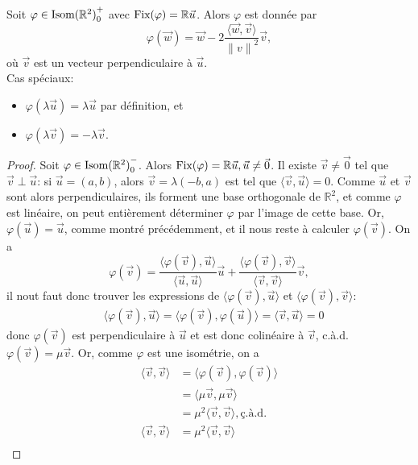 \documentclass{book}
\numberwithin{equation}{section}
\renewcommand{\phi}{\varphi}
\providecommand{\plan}{{\mathbb R^2}}
\providecommand{\origin}{{\vec 0}}
\providecommand{\isom}{{\textnormal{Isom}(\plan)}}
\providecommand{\isomop}{\isom_0^+}
\providecommand{\isomom}{\isom_0^-}
\providecommand{\Fix}{{\textnormal{Fix}}}
\providecommand{\longueur}[1]{{\lVert#1\rVert}}
\providecommand{\scalaire}[1]{{\langle#1\rangle}}
\begin{document}
\begin{thm}
	Soit $\phi \in \isomop$ avec $\Fix(\phi) = \mathbb R \vec u$. Alors $\phi$ est donnée par 
	\begin{equation}
		\phi(\vec w) = \vec w - 2\frac{\scalaire{\vec w, \vec v}}{\longueur{v}^2} \vec v,
	\end{equation}
	où $\vec v$ est un vecteur perpendiculaire à $\vec u$.\\
	Cas spéciaux:
	\begin{itemize}
		\item $\phi(\lambda \vec u) = \lambda \vec u$ par définition, et
		\item $\phi(\lambda \vec v) = -\lambda \vec v$.
	\end{itemize}
\end{thm}
\begin{proof}
	Soit $\phi \in \isomom$. Alors $\Fix(\phi) = \mathbb R \vec u, \vec u \neq \origin$. Il existe $\vec v \neq \origin$ tel que $\vec v \perp \vec u$: si $\vec u = (a, b)$, alors $\vec v = \lambda(-b, a)$ est tel que $\scalaire{\vec v, \vec u} = 0$. Comme $\vec u$ et $\vec v$ sont alors perpendiculaires, ils forment une base orthogonale de $\plan$, et comme $\phi$ est linéaire, on peut entièrement déterminer $\phi$ par l'image de cette base. Or, $\phi(\vec u) = \vec u$, comme montré précédemment, et il nous reste à calculer $\phi(\vec v)$. On a
	\begin{equation*}
		\phi(\vec v) = \frac{\scalaire{\phi(\vec v), \vec u}}{\scalaire{\vec u, \vec u}}\vec u + \frac{\scalaire{\phi(\vec v), \vec v}}{\scalaire{\vec v, \vec v}}\vec v,
	\end{equation*}
	il nout faut donc trouver les expressions de $\scalaire{\phi(\vec v), \vec u}$ et $\scalaire{\phi(\vec v), \vec v}$:
	\begin{align*}
		&\scalaire{\phi(\vec v), \vec u} = \scalaire{\phi(\vec v), \phi(\vec u)} = \scalaire{\vec v, \vec u} = 0
	\end{align*}
	donc $\phi(\vec v)$ est perpendiculaire à $\vec u$ et est donc colinéaire à $\vec v$, c.à.d. $\phi(\vec v) = \mu \vec v$. Or, comme $\phi$ est une isométrie, on a
	\begin{align*}
		\scalaire{\vec v, \vec v} &= \scalaire{\phi(\vec v), \phi(\vec v)}\\
		&= \scalaire{\mu \vec v, \mu \vec v}\\
		&= \mu^2 \scalaire{\vec v, \vec v}, \text{ç.à.d.}\\
		\scalaire{\vec v, \vec v} &= \mu^2 \scalaire{\vec v, \vec v}\\

\end{align*}
\end{proof}
\end{document}
